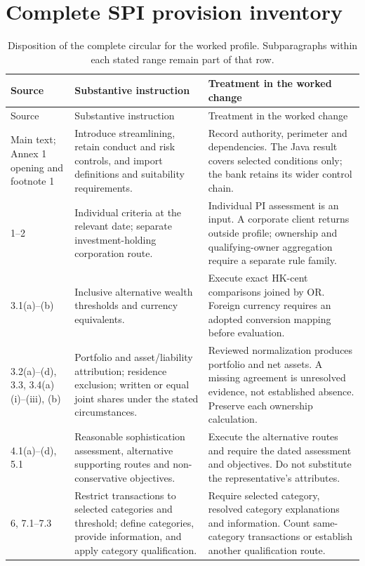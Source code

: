 \documentclass[12pt,a4paper,oneside,openany]{book}
\begin{document}
\section{Complete SPI provision inventory}
\begingroup\small
\begin{longtable}{P{0.14\textwidth}P{0.37\textwidth}P{0.39\textwidth}}
\caption{Disposition of the complete circular for the worked profile. Subparagraphs
within each stated range remain part of that row.}\label{tab:circular-inventory}\\
\toprule Source & Substantive instruction & Treatment in the worked change \\\midrule
\endfirsthead
\toprule Source & Substantive instruction & Treatment in the worked change \\\midrule
\endhead
Main text; Annex 1 opening and footnote 1 & Introduce streamlining, retain conduct and risk controls, and import definitions and suitability requirements. & Record authority, perimeter and dependencies. The Java result covers selected conditions only; the bank retains its wider control chain.\\
1--2 & Individual criteria at the relevant date; separate investment-holding corporation route. & Individual PI assessment is an input. A corporate client returns outside profile; ownership and qualifying-owner aggregation require a separate rule family.\\
3.1(a)--(b) & Inclusive alternative wealth thresholds and currency equivalents. & Execute exact HK-cent comparisons joined by OR. Foreign currency requires an adopted conversion mapping before evaluation.\\
3.2(a)--(d), 3.3, 3.4(a)(i)--(iii), (b) & Portfolio and asset/liability attribution; residence exclusion; written or equal joint shares under the stated circumstances. & Reviewed normalization produces portfolio and net assets. A missing agreement is unresolved evidence, not established absence. Preserve each ownership calculation.\\
4.1(a)--(d), 5.1 & Reasonable sophistication assessment, alternative supporting routes and non-conservative objectives. & Execute the alternative routes and require the dated assessment and objectives. Do not substitute the representative's attributes.\\
6, 7.1--7.3 & Restrict transactions to selected categories and threshold; define categories, provide information, and apply category qualification. & Require selected category, resolved category explanations and information. Count same-category transactions or establish another qualification route.\\

\end{longtable}
\end{document}
